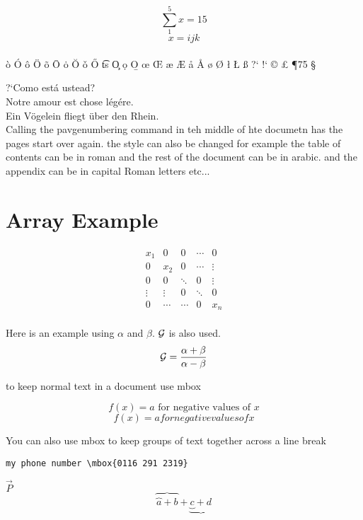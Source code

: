\documentclass[12pt,twoside,leqno]{article}%
\begin{document}
\[
\textstyle \sum_{1}^ {5} x=15
\]
\begin{equation}
x=i\scriptstyle j \scriptscriptstyle k
\end{equation}
\\
\`{o}
\'{O}
\^{o}
\"{O}
\~{o}
\={O}
\.{o}
\u{O}
\v{o}
\H{O}
\t{ts}
\c{O}
\d{o}
\b{O}
\oe
\OE
\ae
\AE
\aa
\AA
\o
\O
\l
\L
\ss
?`
!`
\copyright
\pounds
\P75
\S
\dag
\ddag

?`Como est\'{a} ustead?\\
Notre amour est chose l\'{e}g\'{e}re.\\
Ein V\"{o}gelein fliegt \"{u}ber den Rhein.\\

Calling the pavgenumbering command in teh middle of hte documetn has the pages start over again. the style can also be changed for example the table of contents can be in roman and the rest of the document can be in arabic. and the appendix can be in capital Roman letters etc...
\section{Array Example}
\[
\begin{array}{ccccc}
x_1 & 0 & 0 &\cdots & 0 \\
0   & x_2 & 0 & \cdots & \vdots \\
0 & 0 & \ddots & 0 & \vdots \\
\vdots & \vdots & 0 & \ddots & 0 \\
0 & \cdots & \cdots & 0 & x_n \\
\end{array}
\]

Here is an example using $\alpha$ and $\beta$. $\cal G$ is also used.
\begin{equation}
{\cal G } = \frac{\alpha +\beta}{\alpha - \beta}
\end{equation}

to keep normal text in a document use mbox

\begin{equation}
f(x)=a \mbox{ for negative values of } x
\end{equation}
\begin{equation}
f(x)=a for negative values of
x
\end{equation}

You can also use mbox to keep groups of text together across a line break
\begin{verbatim}
my phone number \mbox{0116 291 2319}
\end{verbatim}
$\vec{P}$\\
\[
\overbrace{\overbrace{a} + b} + \underbrace {\underbrace{c} + d}
\]
\end{document}
